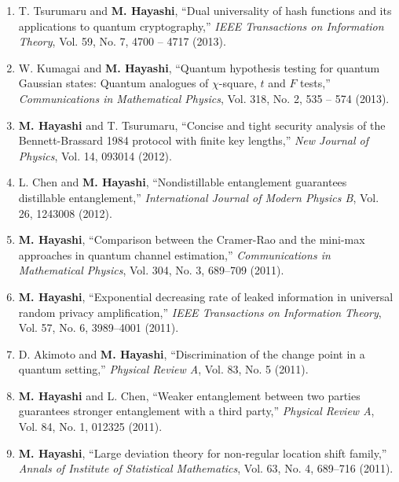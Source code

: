 \documentclass[a4paper,12pt,oneside]{article}
\begin{document}
\begin{enumerate}
\item T. Tsurumaru and \textbf{M. Hayashi}, 
``Dual universality of hash functions and its applications to quantum cryptography,''
{\em IEEE Transactions on Information Theory},
Vol. 59, No. 7, 4700 -- 4717 (2013). 

\item W. Kumagai and \textbf{M. Hayashi}, 
``Quantum hypothesis testing for quantum Gaussian states: Quantum analogues of $\chi$-square, $t$ and $F$ tests,''  {\em Communications in Mathematical Physics}, Vol. 318, No. 2, 535 -- 574 (2013). 

\item \textbf{M. Hayashi} and T. Tsurumaru, 
``Concise and tight security analysis of the Bennett-Brassard 1984 protocol with finite key lengths,'' 
{\em New Journal of Physics}, Vol. 14, 093014 (2012).

\item L. Chen and \textbf{M. Hayashi}, 
``Nondistillable entanglement guarantees distillable entanglement,''
{\em International Journal of Modern Physics B}, Vol. 26, 1243008 (2012).

\item \textbf{M. Hayashi}, 
``Comparison between the Cramer-Rao and the mini-max approaches in quantum channel estimation,'' 
{\em Communications in Mathematical Physics}, Vol. 304, No. 3, 689--709 (2011).

\item   \textbf{M. Hayashi}, 
``Exponential decreasing rate of leaked information in universal random privacy amplification,'' 
{\em IEEE Transactions on Information Theory}, Vol. 57, No. 6, 3989--4001 (2011).

\item   D. Akimoto and \textbf{M. Hayashi}, 
``Discrimination of the change point in a quantum setting,''
{\em Physical Review A}, Vol. 83, No. 5 (2011).

\item   \textbf{M. Hayashi} and L. Chen, 
``Weaker entanglement between two parties guarantees stronger entanglement with a third party,'' 
{\em Physical Review A}, Vol. 84, No. 1, 012325 (2011). 

\item   \textbf{M. Hayashi}, 
``Large deviation theory for non-regular location shift family,''
{\em Annals of Institute of Statistical Mathematics}, Vol. 63, No. 4, 689--716 (2011).


\end{enumerate}
\end{document}

